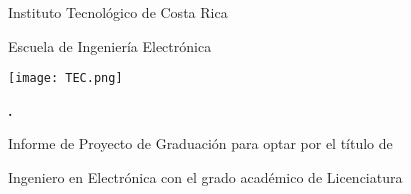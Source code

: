 
\thispagestyle{empty} 

\begin{center}

Instituto Tecnológico de Costa Rica

\par\vspace{1ex}

Escuela de Ingeniería Electrónica

\par\vspace{20mm}

\texttt{[image: TEC.png]}

\par\vspace*{\fill}

{\large\bf{\scriptTitle.}}

\par\vspace*{\fill}

Informe de Proyecto de Graduación para optar por el título de

Ingeniero en Electrónica con el grado académico de Licenciatura

\par\vspace{20mm}

\scriptAuthor

\vspace*{\fill}

\end{center}
\newpage 
\cleardoublepage 


